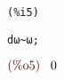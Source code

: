 \noindent
\begin{minipage}[t]{8ex}
\color{red}\bf
\begin{verbatim}
(%i5) 
\end{verbatim}
\end{minipage}
\begin{minipage}[t]{\textwidth}
\color{blue}
\begin{verbatim}
dω~ω;
\end{verbatim}
\end{minipage}
\begin{math}\displaystyle
\parbox{8ex}{\color{labelcolor}(\%o5) }
0
\end{math}
